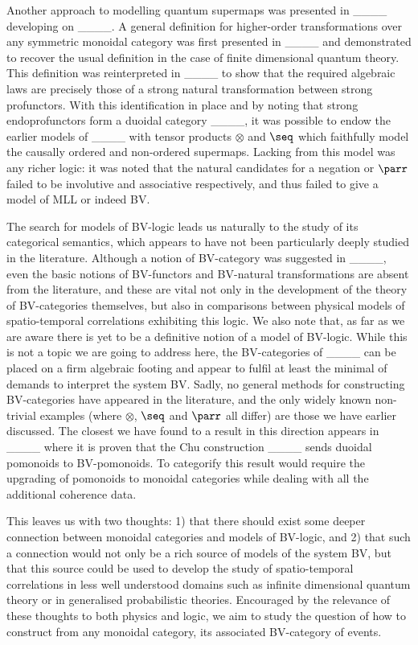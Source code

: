 Another approach to modelling quantum supermaps was presented in ____ developing on ____.
A general definition for higher-order transformations over any symmetric monoidal category was first presented in ____ and demonstrated to recover the usual definition in the case of finite dimensional quantum theory.
This definition was reinterpreted in ____ to show that the required algebraic laws are precisely those of a strong natural transformation between strong profunctors.
With this identification in place and by noting that strong endoprofunctors form a duoidal category ____, it was possible to endow the earlier models of ____ with tensor products $\otimes$ and $\seq$ which faithfully model the causally ordered and non-ordered supermaps.
Lacking from this model was any richer logic: it was noted that the natural candidates for a negation or $\parr$ failed to be involutive and associative respectively, and thus failed to give a model of MLL or indeed BV.

The search for models of BV-logic leads us naturally to the study of its categorical semantics, which appears to have not been particularly deeply studied in the literature.
Although a notion of BV-category was suggested in ____, even the basic notions of BV-functors and BV-natural transformations are absent from the literature, and these are vital not only in the development of the theory of BV-categories themselves, but also in comparisons between physical models of spatio-temporal correlations exhibiting this logic.
We also note that, as far as we are aware there is yet to be a definitive notion of a model of BV-logic.
While this is not a topic we are going to address here, the BV-categories of ____ can be placed on a firm algebraic footing and appear to fulfil at least the minimal of demands to interpret the system BV.
Sadly, no general methods for constructing BV-categories have appeared in the literature, and the only widely known non-trivial examples (where $\otimes$, $\seq$ and $\parr$ all differ) are those we have earlier discussed.
The closest we have found to a result in this direction appears in ____ where it is proven that the Chu construction ____ sends duoidal pomonoids to BV-pomonoids.
To categorify this result would require the upgrading of pomonoids to monoidal categories while dealing with all the additional coherence data.

This leaves us with two thoughts: 1) that there should exist some deeper connection between monoidal categories and models of BV-logic, and 2) that such a connection would not only be a rich source of models of the system BV, but that this source could be used to develop the study of spatio-temporal correlations in less well understood domains such as infinite dimensional quantum theory or in generalised probabilistic theories.
Encouraged by the relevance of these thoughts to both physics and logic, we aim to study the question of how to construct from any monoidal category, its associated BV-category of events.